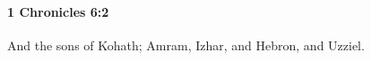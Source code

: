
		\paragraph{1 Chronicles 6:2} %
			\label{1CHRONICLES-6-2}

			And the sons of Kohath; Amram, Izhar, and Hebron, and Uzziel.


